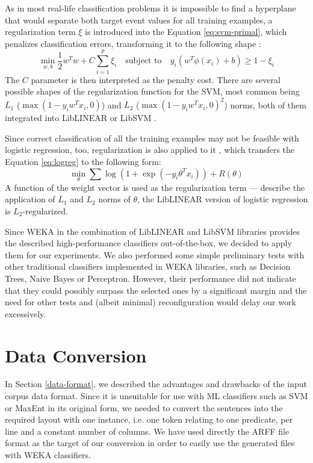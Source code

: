 \documentclass[12pt,notitlepage]{report}
\begin{document}
As in most real-life classification problems it is impossible to find a hyperplane that would separate both target event values for all training examples, a regularization \citep{neumaier98} term $\xi$ is introduced into the Equation \ref{eq:svm-primal}, which penalizes classification errors, transforming it to the following shape \citep{cortes95}:
\begin{equation}
\min_{w,b} \frac{1}{2}w^T w + C\sum_{i=1}^p \xi_i \quad\mbox{subject to}\quad y_i(w^T\phi(x_i) + b)\geq 1 - \xi_i
\end{equation}
The $C$ parameter is then interpreted as the penalty cost. There are several possible shapes of the regularization function for the SVM, most common being $L_1$ ($\max(1-y_i w^T x_i, 0)$) and $L_2$ ($\max(1-y_i w^T x_i, 0)^2$) norms, both of them integrated into LibLINEAR or LibSVM \citep{fan08,chang01}.

Since correct classification of all the training examples may not be feasible with logistic regression, too, regularization is also applied to it \citep{ng04,fan08}, which transfers the Equation \ref{eq:logreg} to the following form:
\begin{equation}
\min_\theta \sum\log(1 + \exp(-y_i\theta^T x_i)) + R(\theta)
\end{equation}
A function of the weight vector is used as the regularization term --- \citet{ng04} describe the application of $L_1$ and $L_2$ norms of $\theta$, the LibLINEAR version of logistic regression is $L_2$-regularized.

Since WEKA in the combination of LibLINEAR and LibSVM libraries provides the described high-performance classifiers out-of-the-box, we decided to apply them for our experiments. We also performed some simple preliminary tests with other traditional classifiers implemented in WEKA libraries, such as Decision Trees, Naive Bayes or Perceptron. However, their performance did not indicate that they could possibly surpass the selected ones by a significant margin and the need for other tests and (albeit minimal) reconfiguration would delay our work excessively.

\section{Data Conversion}\label{conversion}

In Section \ref{data-format}, we described the advantages and drawbacks of the input corpus data format. Since it is unsuitable for use with ML classifiers such as SVM or MaxEnt in its original form, we needed to convert the sentences into the required layout with one instance, i.e. one token relating to one predicate, per line and a constant number of columns. We have used directly the ARFF file format as the target of our conversion in order to easily use the generated files with WEKA classifiers.
\end{document}
